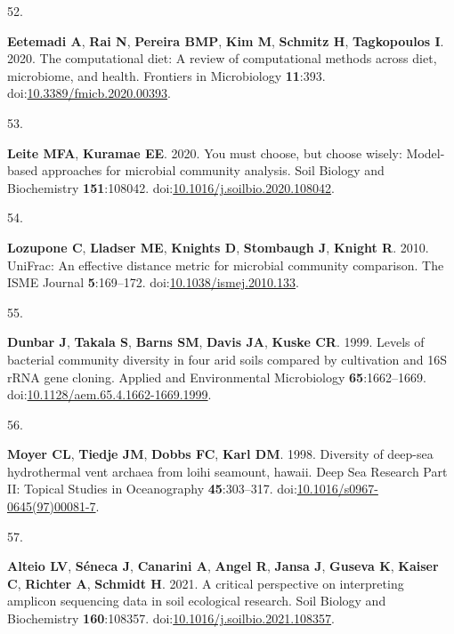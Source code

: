 \documentclass[
]{article}
\newlength{\cslhangindent}
\newlength{\csllabelwidth}
\newlength{\cslentryspacingunit} %
\newenvironment{CSLReferences}[2] %
 {%
  \setlength{\parindent}{0pt}
  \ifodd #1
  \let\oldpar\par
  \def\par{\hangindent=\cslhangindent\oldpar}
  \fi
  \setlength{\parskip}{#2\cslentryspacingunit}
 }%
 {}
\newcommand{\CSLLeftMargin}[1]{\parbox[t]{\csllabelwidth}{#1}}
\newcommand{\CSLRightInline}[1]{\parbox[t]{\linewidth - \csllabelwidth}{#1}\break}
\begin{document}
\begin{CSLReferences}{0}{1}
\leavevmode{}%
\CSLLeftMargin{52. }%
\CSLRightInline{\textbf{Eetemadi A}, \textbf{Rai N}, \textbf{Pereira
BMP}, \textbf{Kim M}, \textbf{Schmitz H}, \textbf{Tagkopoulos I}. 2020.
The computational diet: A review of computational methods across diet,
microbiome, and health. Frontiers in Microbiology \textbf{11}:393.
doi:\href{https://doi.org/10.3389/fmicb.2020.00393}{10.3389/fmicb.2020.00393}.}

\leavevmode{}%
\CSLLeftMargin{53. }%
\CSLRightInline{\textbf{Leite MFA}, \textbf{Kuramae EE}. 2020. You must
choose, but choose wisely: Model-based approaches for microbial
community analysis. Soil Biology and Biochemistry \textbf{151}:108042.
doi:\href{https://doi.org/10.1016/j.soilbio.2020.108042}{10.1016/j.soilbio.2020.108042}.}

\leavevmode{}%
\CSLLeftMargin{54. }%
\CSLRightInline{\textbf{Lozupone C}, \textbf{Lladser ME},
\textbf{Knights D}, \textbf{Stombaugh J}, \textbf{Knight R}. 2010.
{UniFrac}: An effective distance metric for microbial community
comparison. The {ISME} Journal \textbf{5}:169--172.
doi:\href{https://doi.org/10.1038/ismej.2010.133}{10.1038/ismej.2010.133}.}

\leavevmode{}%
\CSLLeftMargin{55. }%
\CSLRightInline{\textbf{Dunbar J}, \textbf{Takala S}, \textbf{Barns SM},
\textbf{Davis JA}, \textbf{Kuske CR}. 1999. Levels of bacterial
community diversity in four arid soils compared by cultivation and 16S
{rRNA} gene cloning. Applied and Environmental Microbiology
\textbf{65}:1662--1669.
doi:\href{https://doi.org/10.1128/aem.65.4.1662-1669.1999}{10.1128/aem.65.4.1662-1669.1999}.}

\leavevmode{}%
\CSLLeftMargin{56. }%
\CSLRightInline{\textbf{Moyer CL}, \textbf{Tiedje JM}, \textbf{Dobbs
FC}, \textbf{Karl DM}. 1998. Diversity of deep-sea hydrothermal vent
archaea from loihi seamount, hawaii. Deep Sea Research Part {II}:
Topical Studies in Oceanography \textbf{45}:303--317.
doi:\href{https://doi.org/10.1016/s0967-0645(97)00081-7}{10.1016/s0967-0645(97)00081-7}.}

\leavevmode{}%
\CSLLeftMargin{57. }%
\CSLRightInline{\textbf{Alteio LV}, \textbf{Séneca J}, \textbf{Canarini
A}, \textbf{Angel R}, \textbf{Jansa J}, \textbf{Guseva K},
\textbf{Kaiser C}, \textbf{Richter A}, \textbf{Schmidt H}. 2021. A
critical perspective on interpreting amplicon sequencing data in soil
ecological research. Soil Biology and Biochemistry \textbf{160}:108357.
doi:\href{https://doi.org/10.1016/j.soilbio.2021.108357}{10.1016/j.soilbio.2021.108357}.}


\end{CSLReferences}
\end{document}
